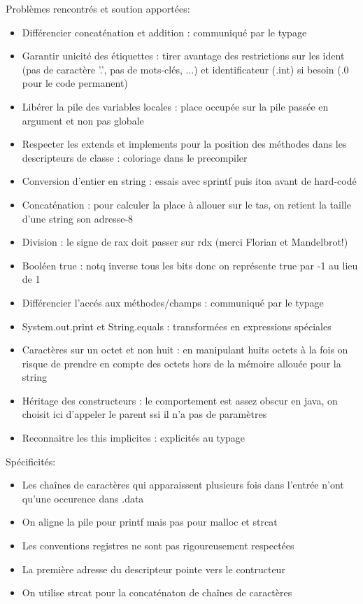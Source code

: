 \documentclass[12pt,a4paper]{report}
\begin{document}
\bigskip
Problèmes rencontrés et soution apportées:
\begin{itemize}
	\item Différencier concaténation et addition : communiqué par le typage
	\item Garantir unicité des étiquettes : tirer avantage des restrictions sur les ident (pas de caractère '.', pas de mots-clés, ...) et identificateur (.int) si besoin (.0 pour le code permanent)
	\item Libérer la pile des variables locales : place occupée sur la pile passée en argument et non pas globale
	\item Respecter les extends et implements pour la position des méthodes dans les descripteurs de classe : coloriage dans le precompiler
	\item Conversion d'entier en string : essais avec sprintf puis itoa avant de
hard-codé
	\item Concaténation : pour calculer la place à allouer sur le tas, on retient la taille d'une string son adresse-8
	\item Division : le signe de rax doit passer sur rdx (merci Florian et Mandelbrot!)
	\item Booléen true : notq inverse tous les bits donc on représente true par -1 au lieu de 1	
	\item Différencier l'accés aux méthodes/champs : communiqué par le typage
	\item System.out.print et String.equals : transformées en expressions spéciales
	\item Caractères sur un octet et non huit : en manipulant huits octets à la fois on risque de prendre en compte des octets hors de la mémoire allouée pour la string
	\item Héritage des constructeurs : le comportement est assez obscur en java, on choisit ici d'appeler le parent ssi il n'a pas de paramètres
	\item Reconnaitre les this implicites : explicités au typage
\end{itemize}
\bigskip

\bigskip
Spécificités:
\begin{itemize}
	\item Les chaînes de caractères qui apparaissent plusieurs fois dans l'entrée n'ont qu'une occurence dans .data
	\item On aligne la pile pour printf mais pas pour malloc et strcat
	\item Les conventions registres ne sont pas rigoureusement respectées
	\item La première adresse du descripteur pointe vers le contructeur
	\item On utilise strcat pour la concaténaton de chaînes de caractères
\end{itemize}
\end{document}
